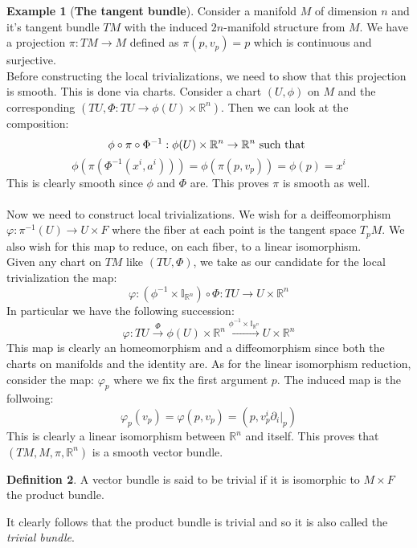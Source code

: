 \documentclass[12pt,a4paper]{report}
\theoremstyle{definition}
\newtheorem{Def}{Definition}[chapter]
\theoremstyle{Theorem}
\theoremstyle{definition}
\newtheorem{Ex}[Def]{Example}
\theoremstyle{definition}
\begin{document}
			\begin{Ex}[\textbf{The tangent bundle}]
				Consider a manifold $M$ of dimension $n$ and it's tangent bundle $TM$ with the induced $2n$-manifold structure from $M$. We have a projection $\pi:TM\rightarrow M$ defined as $\pi(p,v_p)=p$ which is continuous and surjective. 
				\\
				Before constructing the local trivializations, we need to show that this projection is smooth. This is done via charts. Consider a chart $(U,\phi)$ on $M$ and the corresponding $(TU,\Phi:TU\rightarrow \phi(U)\times \mathbb{R}^n)$. Then we can look at the composition:
				$$\phi\circ \pi\circ \Phi^{-1}:\phi(U)\times \mathbb{R}^n\rightarrow \mathbb{R}^n \hbox{ such that }$$ 
				$$\phi(\pi(\Phi^{-1}(x^i,a^i)))=\phi(\pi(p,v_p))=\phi(p)=x^i$$
				This is clearly smooth since $\phi$ and $\Phi$ are. This proves $\pi$ is smooth as well.\\
				\\
				Now we need to construct local trivializations. We wish for a deiffeomorphism $\varphi:\pi^{-1}(U)\rightarrow U\times F$ where the fiber at each point is the tangent space $T_pM$. We also wish for this map to reduce, on each fiber, to a linear isomorphism.\\
				Given any chart on $TM$ like $(TU,\Phi)$, we take as our candidate for the local trivialization the map: 
				$$\varphi:(\phi^{-1}\times \mathbb{I}_{\mathbb{R}^n})\circ \Phi:TU\rightarrow U\times \mathbb{R}^n$$
				In particular we have the following succession:
				$$\varphi:TU\xrightarrow{\text{$\Phi$}} \phi(U)\times \mathbb{R}^n\xrightarrow{\text{$\phi^{-1}\times \mathbb{I}_{\mathbb{R}^n}$}}U\times \mathbb{R}^n$$
				This map is clearly an homeomorphism and a diffeomorphism since both the charts on manifolds and the identity are. As for the linear isomorphism reduction, consider the map:
				$\varphi_p$ where we fix the first argument $p$. The induced map is the follwoing:
				$$\varphi_p(v_p)=\varphi(p,v_p)=(p,v^i_p\partial_i|_p)$$
				This is clearly a linear isomorphism between $\mathbb{R}^n$ and itself. This proves that $(TM,M,\pi,\mathbb{R}^n)$ is a smooth vector bundle.
			\end{Ex}
			\begin{Def}\label{Def_5.3}
				A vector bundle is said to be trivial if it is isomorphic to $M\times F$ the product bundle.
			\end{Def}
			It clearly follows that the product bundle is trivial and so it is also called the \textit{trivial bundle}.
			
\end{document}
